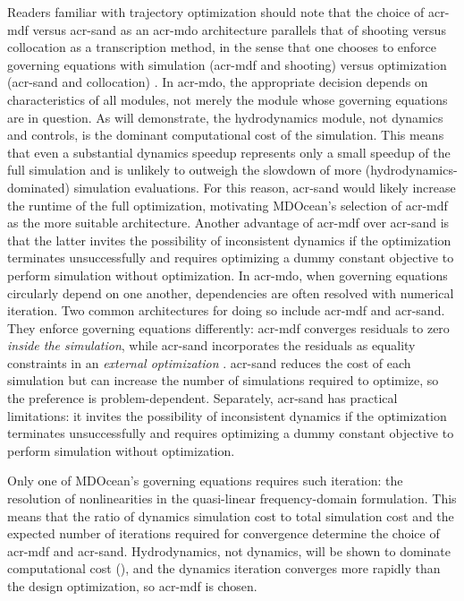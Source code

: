     Readers familiar with trajectory optimization should note that the choice of \gls{acr-mdf} versus \gls{acr-sand} as an \gls{acr-mdo} architecture parallels that of shooting versus collocation as a transcription method, in the sense that one chooses to enforce governing equations with simulation (\gls{acr-mdf} and shooting) versus optimization (\gls{acr-sand} and collocation) \citep{tedrake_underactuated_2024}.
    In \gls{acr-mdo}, the appropriate decision depends on characteristics of all modules, not merely the module whose governing equations are in question.
    As  will demonstrate, the hydrodynamics module, not dynamics and controls, is the dominant computational cost of the simulation.
    This means that even a substantial dynamics speedup represents only a small speedup of the full simulation and is unlikely to outweigh the slowdown of more (hydrodynamics-dominated) simulation evaluations.
    For this reason, \gls{acr-sand} would likely increase the runtime of the full optimization, motivating MDOcean's selection of \gls{acr-mdf} as the more suitable architecture.
    Another advantage of \gls{acr-mdf} over \gls{acr-sand} is that the latter invites the possibility of inconsistent dynamics if the optimization terminates unsuccessfully \citep{martins_multidisciplinary_2013} and requires optimizing a dummy constant objective to perform simulation without optimization.
\else
    In \gls{acr-mdo}, when governing equations circularly depend on one another,
    dependencies are often resolved with numerical iteration.
    Two common architectures for doing so include \acrfull{acr-mdf} and \acrfull{acr-sand}.
    They enforce governing equations differently: 
    \gls{acr-mdf} converges residuals to zero \emph{inside the simulation},
    while \gls{acr-sand} incorporates the residuals as equality constraints in an \emph{external optimization} \citep{martins_multidisciplinary_2013}.
    \gls{acr-sand} reduces the cost of each simulation but can increase the number of simulations required to optimize,
    so the preference is problem-dependent.
    Separately, \gls{acr-sand} has practical limitations:
    it invites the possibility of inconsistent dynamics if the optimization terminates unsuccessfully \citep{martins_multidisciplinary_2013}
    and requires optimizing a dummy constant objective to perform simulation without optimization.

    Only one of MDOcean's governing equations requires such iteration:
    the resolution of nonlinearities in the quasi-linear frequency-domain formulation.
    This means that the ratio of dynamics simulation cost to total simulation cost and the expected number of iterations required for convergence determine the choice of \gls{acr-mdf} and \gls{acr-sand}.
    Hydrodynamics, not dynamics, will be shown to dominate computational cost (), and the dynamics iteration converges more rapidly than the design optimization, so \gls{acr-mdf} is chosen.
\fi

